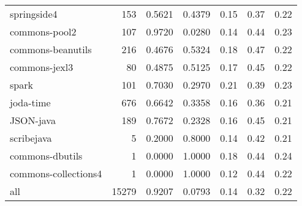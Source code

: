 \begin{table*}
\begin{tabular}{lrrrrrr}
            springside4 &    153 &          0.5621 &          0.4379 &         0.15 &         0.37 &             0.22 \\
          commons-pool2 &    107 &          0.9720 &          0.0280 &         0.14 &         0.44 &             0.23 \\
      commons-beanutils &    216 &          0.4676 &          0.5324 &         0.18 &         0.47 &             0.22 \\
          commons-jexl3 &     80 &          0.4875 &          0.5125 &         0.17 &         0.45 &             0.22 \\
                  spark &    101 &          0.7030 &          0.2970 &         0.21 &         0.39 &             0.23 \\
              joda-time &    676 &          0.6642 &          0.3358 &         0.16 &         0.36 &             0.21 \\
              JSON-java &    189 &          0.7672 &          0.2328 &         0.16 &         0.45 &             0.21 \\
             scribejava &      5 &          0.2000 &          0.8000 &         0.14 &         0.42 &             0.21 \\
        commons-dbutils &      1 &          0.0000 &          1.0000 &         0.18 &         0.44 &             0.24 \\
   commons-collections4 &      1 &          0.0000 &          1.0000 &         0.12 &         0.44 &             0.22 \\
                    all &  15279 &          0.9207 &          0.0793 &         0.14 &         0.32 &             0.22 \\
\bottomrule
\end{tabular}
\end{table*}
